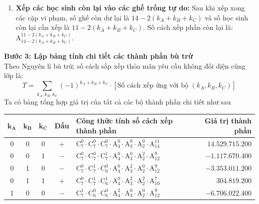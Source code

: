 \begin{ex}
{\begin{enumerate}
\begin{itemize}
				\item Chọn và xếp học sinh lớp $B$ vào $k_B$ cặp ghế: $\mathrm{A}_3^{2k_B}$ cách.
				\item Chọn và xếp học sinh lớp $C$ vào $k_C$ cặp ghế: $\mathrm{A}_2^{2k_C}$ cách.
			\end{itemize}
			\item \textbf{Xếp các học sinh còn lại vào các ghế trống tự do:}
			Sau khi xếp xong các cặp vi phạm, số ghế còn dư lại là $14 - 2(k_A+k_B+k_C)$ và số học sinh còn lại cần xếp là $11 - 2(k_A+k_B+k_C)$. Số cách xếp phần còn lại là: $\mathrm{A}_{14 - 2(k_A+k_B+k_C)}^{11 - 2(k_A+k_B+k_C)}$.
		\end{enumerate}
		\textbf{Bước 3: Lập bảng tính chi tiết các thành phần bù trừ}\\
		Theo Nguyên lí bù trừ, số cách sắp xếp thỏa mãn yêu cầu không đối diện cùng lớp là:
		$$T = \sum_{k_A, k_B, k_C} (-1)^{k_A + k_B + k_C} \cdot \left[ \text{Số cách xếp ứng với bộ } (k_A, k_B, k_C) \right]$$
		Ta có bảng tổng hợp giá trị của tất cả các bộ thành phần chi tiết như sau
		\begin{center}
			\small
			\renewcommand{\arraystretch}{1.3}
			\begin{tabular}{|c|c|c|c|l|r|}
				\hline
				$\mathbf{k_A}$ & $\mathbf{k_B}$ & $\mathbf{k_C}$ & \textbf{Dấu} & \textbf{Công thức tính số cách xếp thành phần} & \textbf{Giá trị thành phần} \\ \hline
				0 & 0 & 0 & $+$ & $\mathrm{C}_7^0 \cdot \mathrm{C}_7^0 \cdot \mathrm{C}_7^0 \cdot \mathrm{A}_4^0 \cdot \mathrm{A}_3^0 \cdot \mathrm{A}_2^0 \cdot \mathrm{A}_{14}^{11}$ & $14.529.715.200$ \\ \hline
				0 & 0 & 1 & $-$ & $\mathrm{C}_7^0 \cdot \mathrm{C}_7^0 \cdot \mathrm{C}_7^1 \cdot \mathrm{A}_4^0 \cdot \mathrm{A}_3^0 \cdot \mathrm{A}_2^2 \cdot \mathrm{A}_{12}^9$ & $-1.117.670.400$ \\ \hline
				0 & 1 & 0 & $-$ & $\mathrm{C}_7^0 \cdot \mathrm{C}_7^1 \cdot \mathrm{C}_6^0 \cdot \mathrm{A}_4^0 \cdot \mathrm{A}_3^2 \cdot \mathrm{A}_2^0 \cdot \mathrm{A}_{12}^9$ & $-3.353.011.200$ \\ \hline
				0 & 1 & 1 & $+$ & $\mathrm{C}_7^0 \cdot \mathrm{C}_7^1 \cdot \mathrm{C}_6^1 \cdot \mathrm{A}_4^0 \cdot \mathrm{A}_3^2 \cdot \mathrm{A}_2^2 \cdot \mathrm{A}_{10}^7$ & $304.819.200$ \\ \hline
				1 & 0 & 0 & $-$ & $\mathrm{C}_7^1 \cdot \mathrm{C}_6^0 \cdot \mathrm{C}_6^0 \cdot \mathrm{A}_4^2 \cdot \mathrm{A}_3^0 \cdot \mathrm{A}_2^0 \cdot \mathrm{A}_{12}^9$ & $-6.706.022.400$ \\ \hline

\end{tabular}
\end{center}}
\end{ex}
